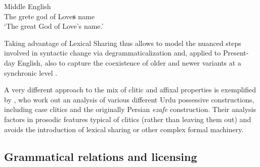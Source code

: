 \documentclass[output=paper,hidelinks]{langscibook}
\begin{document}
\begin{exe}
\ex Middle English \citep[219]{Lowe15} \label{chaucer}\\
{The} {grete} {god} {of} {Love\textbf{s}} name \\
\glt `The great God of Love's name.'
\end{exe}


\noindent Taking advantage of Lexical Sharing thus allows \citet{Lowe15} to model the nuanced steps involved in syntactic change via degrammaticalization and, applied to Present-day English, also to capture the coexistence of  older and newer variants at a synchronic level \citep{lowe2015clitic}. 

A very different approach to the mix of clitic and affixal properties is exemplified by \citet{boegelbutt2012}, who work out an analysis of various different Urdu possessive constructions, including case clitics and the originally Persian \textit{ezafe} construction.  Their analysis factors in prosodic features  typical of clitics (rather than leaving them out) and avoids the introduction of lexical sharing or other complex formal  machinery. 


\subsection{Grammatical relations and licensing}\label{subsect:pos-license}
\end{document}
